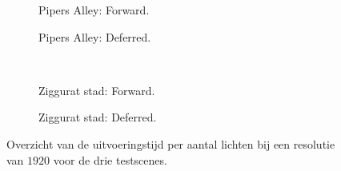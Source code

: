 \begin{figure}[t]
  \begin{adjustbox}{minipage=\textwidth, scale=0.6}
    \begin{subfigure}[b]{0.8\textwidth}
      \centering
      \def\svgwidth{\textwidth}
      
      \caption{Pipers Alley: Forward.}
      \label{fig:ts-lights-forward:alley}
    \end{subfigure}
  \end{adjustbox}\hspace{-0.075\textwidth} %
  \begin{adjustbox}{minipage=\textwidth, scale=0.6}
    \begin{subfigure}[b]{0.8\textwidth}
      \centering
      \def\svgwidth{\textwidth}
      
      \caption{Pipers Alley: Deferred.}
      \label{fig:ts-lights-deferred:alley}
    \end{subfigure}
  \end{adjustbox} \\
  \begin{adjustbox}{minipage=\textwidth, scale=0.6}
    \begin{subfigure}[b]{0.8\textwidth}
      \centering
      \def\svgwidth{\textwidth}
      
      \caption{Ziggurat stad: Forward.}
      \label{fig:ts-lights-forward:city}
    \end{subfigure}
  \end{adjustbox}\hspace{-0.075\textwidth} %
  \begin{adjustbox}{minipage=\textwidth, scale=0.6}
    \begin{subfigure}[b]{0.8\textwidth}
      \centering
      \def\svgwidth{\textwidth}
      
      \caption{Ziggurat stad: Deferred.}
      \label{fig:ts-lights-deferred:city}
    \end{subfigure}
  \end{adjustbox}
  \caption{Overzicht van de uitvoeringstijd per aantal lichten bij een resolutie
           van $1920$ voor de drie testscenes.}
  \label{fig:ts-lights}
\end{figure}

